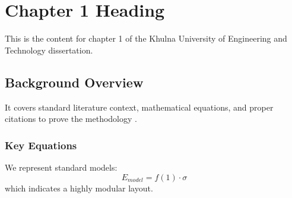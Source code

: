 \chapter{Chapter 1 Heading}
\label{ch:chapter1}
This is the content for chapter 1 of the Khulna University of Engineering and Technology dissertation.

\section{Background Overview}
It covers standard literature context, mathematical equations, and proper citations to prove the methodology \cite{texbook}.

\subsection{Key Equations}
We represent standard models:
\begin{equation}
    E_{model} = f(1) \cdot \sigma
\end{equation}
which indicates a highly modular layout.
